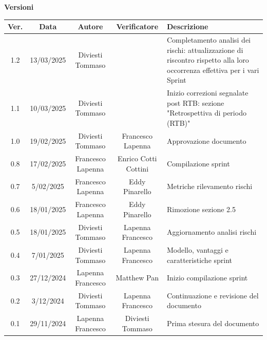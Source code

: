 \documentclass{article}
\begin{document}
\newpage
\begin{table}[h!]
\centering
\textbf{Versioni} \\ %
\vspace{2mm} %
\renewcommand{\arraystretch}{1.7}
    
\begin{tabular}{|c|c|c|c|m{}|}
    \hline
    \textbf{Ver.} & \textbf{Data} & \textbf{Autore} & \textbf{Verificatore} & \textbf{Descrizione} \\
    \hline
    1.2 & 13/03/2025 & Diviesti Tommaso &  & Completamento analisi dei rischi: attualizzazione di riscontro rispetto alla loro occorrenza effettiva per i vari Sprint \\
    \hline
    1.1 & 10/03/2025 & Diviesti Tommaso &  & Inizio correzioni segnalate post RTB: sezione "Retrospettiva di periodo (RTB)" \\
    \hline
    1.0 & 19/02/2025 & Diviesti Tommaso & Francesco Lapenna & Approvazione documento \\
    \hline
    0.8 & 17/02/2025 & Francesco Lapenna & Enrico Cotti Cottini & Compilazione sprint \\
    \hline
    0.7 & 5/02/2025 & Francesco Lapenna & Eddy Pinarello & Metriche rilevamento rischi \\
    \hline
    0.6 & 18/01/2025 & Francesco Lapenna & Eddy Pinarello & Rimozione sezione 2.5 \\
    \hline
    0.5 & 18/01/2025 & Diviesti Tommaso & Lapenna Francesco & Aggiornamento analisi rischi \\
    \hline
    0.4 & 7/01/2025 & Diviesti Tommaso & Lapenna Francesco & Modello, vantaggi e caratteristiche sprint \\
    \hline
    0.3 & 27/12/2024 & Lapenna Francesco & Matthew Pan & Inizio compilazione sprint \\
    \hline
    0.2 & 3/12/2024 & Diviesti Tommaso & Lapenna Francesco & Continuazione e revisione del documento \\
    \hline
    0.1 & 29/11/2024 & Lapenna Francesco & Diviesti Tommaso & Prima stesura del documento \\
    \hline
\end{tabular}
\end{table}
\end{document}
